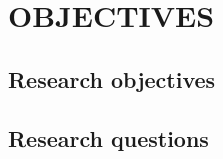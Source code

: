 \section{OBJECTIVES} \label{sec:objectives}

\subsection{Research objectives}

\subsection{Research questions}

